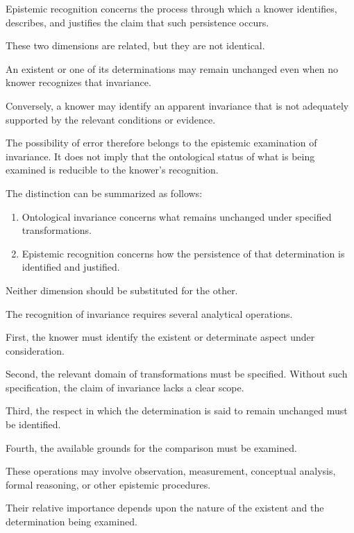 Epistemic recognition concerns the process
through which a knower identifies, describes,
and justifies the claim that such persistence
occurs.

These two dimensions are related, but they
are not identical.

An existent or one of its determinations
may remain unchanged even when no knower
recognizes that invariance.

Conversely, a knower may identify an apparent
invariance that is not adequately supported
by the relevant conditions or evidence.

The possibility of error therefore belongs
to the epistemic examination of invariance.
It does not imply that the ontological status
of what is being examined is reducible to
the knower's recognition.

The distinction can be summarized as follows:

\begin{enumerate}
    \item Ontological invariance concerns
    what remains unchanged under specified
    transformations.

    \item Epistemic recognition concerns
    how the persistence of that determination
    is identified and justified.
\end{enumerate}

Neither dimension should be substituted
for the other.


The recognition of invariance requires
several analytical operations.

First, the knower must identify the
existent or determinate aspect under
consideration.

Second, the relevant domain of
transformations must be specified.
Without such specification, the
claim of invariance lacks a clear
scope.

Third, the respect in which the
determination is said to remain
unchanged must be identified.

Fourth, the available grounds for
the comparison must be examined.

These operations may involve
observation, measurement, conceptual
analysis, formal reasoning, or
other epistemic procedures.

Their relative importance depends
upon the nature of the existent
and the determination being examined.

